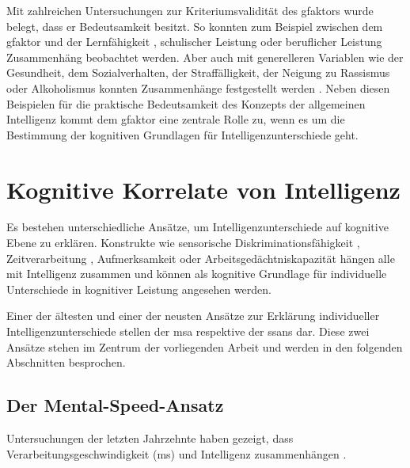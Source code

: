 \documentclass[11pt, twoside, a4paper]{book}		%
\begin{document}
Mit zahlreichen Untersuchungen zur Kriteriumsvalidität des \gls{gfaktor}s wurde belegt, dass er Bedeutsamkeit besitzt. So konnten zum Beispiel zwischen dem \gls{gfaktor} und der Lernfähigkeit \citep{Christal1991}, schulischer Leistung \citep{Jensen1998b} oder beruflicher Leistung \citep{Schmidt2004} Zusammenhäng beobachtet werden. Aber auch mit generelleren Variablen wie der Gesundheit, dem Sozialverhalten, der Straffälligkeit, der Neigung zu Rassismus oder Alkoholismus konnten Zusammenhänge festgestellt werden \citep[für eine Übersicht siehe][]{Brand1987}. Neben diesen Beispielen für die praktische Bedeutsamkeit des Konzepts der allgemeinen Intelligenz kommt dem \gls{gfaktor} eine zentrale Rolle zu, wenn es um die Bestimmung der kognitiven Grundlagen für Intelligenzunterschiede geht.





\section{Kognitive Korrelate von Intelligenz}

Es bestehen unterschiedliche Ansätze, um Intelligenzunterschiede auf kognitive Ebene zu erklären. Konstrukte wie sensorische Diskriminationsfähigkeit \citep[z. B.][]{Galton1883, Spearman1904, Deary2004, Meyer2010}, Zeitverarbeitung \citep[z. B.][]{Rammsayer2002}, Aufmerksamkeit \citep[z. B.][]{Schweizer2004} oder Arbeitsgedächtniskapazität \citep[für eine Übersichtsarbeit siehe][]{Ackerman2005} hängen alle mit Intelligenz zusammen und können als kognitive Grundlage für individuelle Unterschiede in kognitiver Leistung angesehen werden. 

Einer der ältesten und einer der neusten Ansätze zur Erklärung individueller Intelligenzunterschiede stellen der \gls{msa} respektive der \gls{ssans} dar.
Diese zwei Ansätze stehen im Zentrum der vorliegenden Arbeit und werden in den folgenden Abschnitten besprochen.


\subsection{Der Mental-Speed-Ansatz \label{subsec:Der Mental-Speed-Ansatz}}

Untersuchungen der letzten Jahrzehnte  haben gezeigt, dass Verarbeitungsgeschwindigkeit (\gls{ms}) und Intelligenz zusammenhängen \citep[für Übersichtsarbeiten siehe][]{Deary2000a, Jensen2006, Sheppard2008}. 
\end{document}
